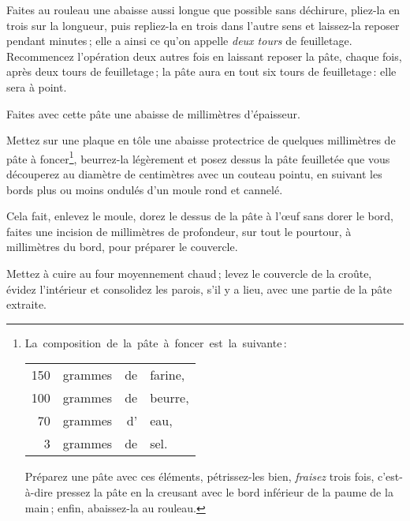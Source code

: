 Faites au rouleau une abaisse aussi longue que possible sans déchirure,
pliez-la en trois sur la longueur, puis repliez-la en trois dans l'autre sens
et laissez-la reposer pendant {\mmm} minutes ; elle a ainsi ce qu'on
appelle \textit{deux tours} de feuilletage. Recommencez l'opération deux autres
fois en laissant reposer la pâte, chaque fois, après deux tours de
feuilletage ; la pâte aura en tout six tours de feuilletage : elle sera
à point.

Faites avec cette pâte une abaisse de {\mmm} millimètres d'épaisseur.

\label{pg0320} \hypertarget{p0320}{}
Mettez sur une plaque en tôle une abaisse protectrice de quelques millimètres
de pâte à foncer\footnote{La composition de la pâte à foncer est la suivante :
                 \medskip
                 \begin{tabular}{rrrl}
                 \hspace{10em}150 & grammes & de & farine,                                                \\
                 \hspace{10em}100 & grammes & de & beurre,                                                \\
                 \hspace{10em} 70 & grammes & d' & eau,                                                   \\
                 \hspace{10em}  3 & grammes & de & sel.                                                   \\
                 \end{tabular}
                 \protect

Préparez une pâte avec ces éléments, pétrissez-les bien, \textit{fraisez} trois
fois, c'est-à-dire pressez la pâte en la creusant avec le bord inférieur de la
paume de la main ; enfin, abaissez-la au rouleau.}, beurrez-la légèrement et
posez dessus la pâte feuilletée que vous découperez au diamètre de {\mmm}
centimètres avec un couteau pointu, en suivant les bords plus ou moins ondulés
d'un moule rond et cannelé.

Cela fait, enlevez le moule, dorez le dessus de la pâte à l'œuf sans dorer le
bord, faites une incision de {\mmm} millimètres de profondeur, sur tout le
pourtour, à {\mmm} millimètres du bord, pour préparer le couvercle.

Mettez à cuire au four moyennement chaud ; levez le couvercle de la croûte,
évidez l'intérieur et consolidez les parois, s'il y a lieu, avec une partie de
la pâte extraite.

